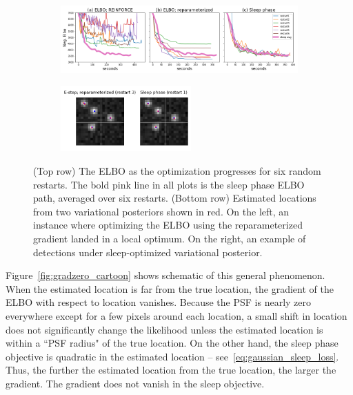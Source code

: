 \begin{figure}[!htb]
    \centering
    \begin{subfigure}[t]{0.9\textwidth}
    \centering
    \includegraphics[width=\textwidth]{figures/optim_path_compare.png}
    \end{subfigure}
    \begin{subfigure}[t]{\textwidth}
    \centering
    \includegraphics[width=0.55\textwidth]{figures/optim_path_detect_compare.png}
    \end{subfigure}
    \vspace{-3em}
    \caption{(Top row) The ELBO as the optimization progresses 
    for six random restarts. 
    The bold pink line in all plots is the sleep phase ELBO path, averaged over six restarts. 
    (Bottom row) Estimated locations from two variational posteriors shown in red. On the left, an instance where optimizing the ELBO using the reparameterized gradient landed in a local optimum.
    On the right, an example of detections under 
    sleep-optimized variational posterior. }
    \label{fig:optim_path}
\end{figure}

Figure~\ref{fig:gradzero_cartoon} shows schematic of this general phenomenon. When the estimated location is far from the true location, the gradient of the ELBO with respect to location vanishes. Because the PSF is nearly zero everywhere except for a few pixels around each location, a small shift in location does not significantly change the likelihood unless the estimated location is within a ``PSF radius" of the true location. On the other hand, the sleep phase objective is quadratic in the estimated location -- see~\eqref{eq:gaussian_sleep_loss}. Thus, the further the estimated location from the true location, the larger the gradient. The gradient does not vanish in the sleep objective. 

